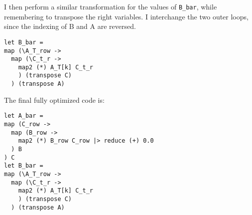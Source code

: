 \documentclass[11pt]{article}
\begin{document}
I then perform a similar transformation for the values of \texttt{B\_bar}, while
remembering to transpose the right variables. I interchange the two
outer loops, since the indexing of B and A are reversed.
\begin{verbatim}
let B_bar =
map (\A_T_row ->
  map (\C_t_r ->
    map2 (*) A_T[k] C_t_r
    ) (transpose C)
  ) (transpose A)
\end{verbatim}

The final fully optimized code is:
\begin{verbatim}
let A_bar =
map (C_row ->
  map (B_row -> 
    map2 (*) B_row C_row |> reduce (+) 0.0
  ) B
) C
let B_bar =
map (\A_T_row ->
  map (\C_t_r ->
    map2 (*) A_T[k] C_t_r
    ) (transpose C)
  ) (transpose A)
\end{verbatim}
\end{document}
